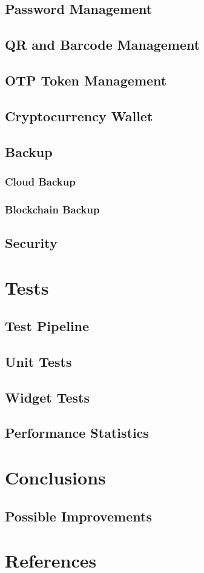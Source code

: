 \documentclass[a4paper,12pt]{report}
\begin{document}
\section{Password Management}

\section{QR and Barcode Management}

\section{OTP Token Management}

\section{Cryptocurrency Wallet}

\section{Backup}

\subsection{Cloud Backup}

\subsection{Blockchain Backup}

\section{Security}

\chapter{Tests}

\section{Test Pipeline}

\section{Unit Tests}

\section{Widget Tests}

\section{Performance Statistics}

\chapter{Conclusions}

\section{Possible Improvements}

\chapter*{References}
\end{document}
